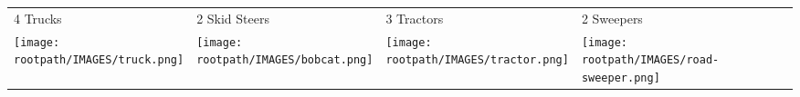 \begin{tabular}{m{}m{}m{}m{}}
    {\color{ccorange} 4 Trucks} & {\color{ccorange} 2 Skid Steers} & {\color{ccorange} 3 Tractors} & {\color{ccorange} 2 Sweepers} \\
    \texttt{[image: \\rootpath/IMAGES/truck.png]}  & \texttt{[image: \\rootpath/IMAGES/bobcat.png]} & \texttt{[image: \\rootpath/IMAGES/tractor.png]} & \texttt{[image: \\rootpath/IMAGES/road-sweeper.png]}                         
    \end{tabular}